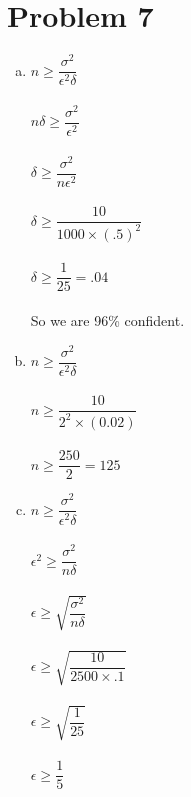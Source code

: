 \documentclass[11pt,letterpaper]{article}
\begin{document}
\section*{Problem 7}
\begin{enumerate}[(a)]
\item
$n\geq \dfrac{\sigma^2}{\epsilon^2\delta}$\\\\
$n\delta\geq \dfrac{\sigma^2}{\epsilon^2}$\\\\
$\delta\geq \dfrac{\sigma^2}{n\epsilon^2}$\\\\
$\delta\geq \dfrac{10}{1000\times(.5)^2}$\\\\
$\delta\geq \dfrac{1}{25} = .04$\\\\
So we are 96\% confident.
\item
$n\geq \dfrac{\sigma^2}{\epsilon^2\delta}$\\\\
$n\geq \dfrac{10}{2^2\times(0.02)}$\\\\
$n\geq \dfrac{250}{2} = 125$\\
\item
$n\geq \dfrac{\sigma^2}{\epsilon^2\delta}$\\\\
$\epsilon^2\geq \dfrac{\sigma^2}{n\delta}$\\\\
$\epsilon\geq \sqrt{\dfrac{\sigma^2}{n\delta}}$\\\\
$\epsilon\geq \sqrt{\dfrac{10}{2500\times.1}}$\\\\
$\epsilon\geq \sqrt{\dfrac{1}{25}}$\\\\
$\epsilon\geq \dfrac{1}{5}$\\\\

\end{enumerate}
\clearpage
\end{document}
